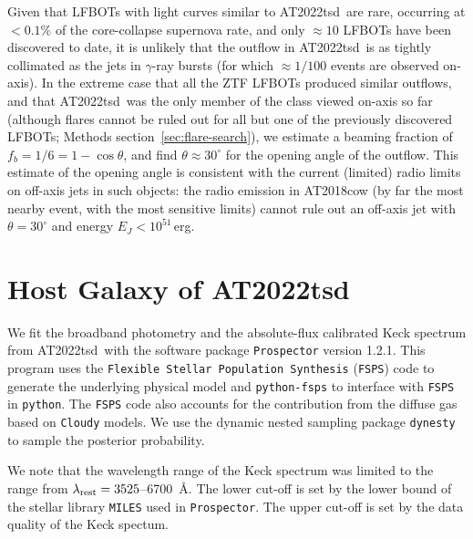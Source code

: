 \documentclass{nature_plusfigure}
\newcommand{\at}{AT2022tsd}
\begin{document}
\begin{methods}
Given that LFBOTs with light curves similar to \at\ are rare, occurring at $<0.1\%$ of the core-collapse supernova rate\cite{Ho2022_RET}, and only $\approx10$ LFBOTs have been discovered to date, it is unlikely that the outflow in \at\ is as tightly collimated as the jets in $\gamma$-ray bursts (for which $\approx1/100$ events are observed on-axis).
In the extreme case that all the ZTF LFBOTs produced similar outflows, and that \at\ was the only member of the class viewed on-axis so far (although flares cannot be ruled out for all but one of the previously discovered LFBOTs; Methods section~\ref{sec:flare-search}), we estimate a beaming fraction of $f_b = 1/6 = 1-\cos{\theta}$, and find $\theta\approx30^{\circ}$ for the opening angle of the outflow. This estimate of the opening angle is consistent with the current (limited) radio limits on off-axis jets in such objects: the radio emission in AT2018cow (by far the most nearby event, with the most sensitive limits) cannot\cite{Margutti2019} rule out an off-axis jet with $\theta=30^{\circ}$ and energy $E_J<10^{51}\,$erg.%

\section{Host Galaxy of \at}
\label{sec:hostgalaxy}

We fit the broadband photometry and the absolute-flux calibrated Keck spectrum from \at\ with the software package \texttt{Prospector} version 1.2.1\cite{Johnson2021}. This program uses the \texttt{Flexible Stellar Population Synthesis} (\texttt{FSPS}) code\cite{Conroy2009} to generate the underlying physical model and \texttt{python-fsps}\cite{ForemanMackey2014} to interface with \texttt{FSPS} in \texttt{python}. The \texttt{FSPS} code also accounts for the contribution from the diffuse gas based on \texttt{Cloudy} models\cite{Byler2017}. We use the dynamic nested sampling package \texttt{dynesty}\cite{Speagle2020} to sample the posterior probability.

We note that the wavelength range of the Keck spectrum was limited to the range from $\lambda_{\rm rest}=3525$--6700~\AA. The lower cut-off is set by the lower bound of the stellar library \texttt{MILES}\cite{SanchezBlazquez2006} used in \texttt{Prospector}. The upper cut-off is set by the data quality of the Keck spectum.%


\end{methods}
\end{document}
